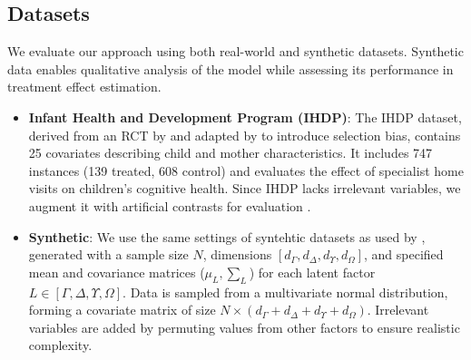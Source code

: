 \documentclass[doubleblind]{ecai}
\begin{document}
\begin{table}[!ht]
\begin{tabular}{lrrrrrrr}
			
			\bottomrule
		\end{tabular}
		
		\label{tab:IHDP}
		
	\end{table}
	\subsection{Datasets}
	We evaluate our approach using both real-world and synthetic datasets. Synthetic data enables qualitative analysis of the model while assessing its performance in treatment effect estimation.
	\begin{itemize}
		
		\item \textbf{Infant Health and Development Program (IHDP)}: The IHDP dataset, derived from an RCT by \citet{Gunn} and adapted by \citet{Hill} to introduce selection bias, contains 25 covariates describing child and mother characteristics. It includes 747 instances (139 treated, 608 control) and evaluates the effect of specialist home visits on children’s cognitive health. Since IHDP lacks irrelevant variables, we augment it with artificial contrasts for evaluation \citep{Khan2024OnTE}.
		
		\item \textbf{Synthetic}: We use the same settings of syntehtic datasets as used by \citet{Negar,Khan2024OnTE}, generated with a sample size 
		$N$, dimensions $\left[{d}_{\Gamma},{d}_{\Delta},{d}_{\Upsilon},{d}_{\Omega}\right]$, and specified mean and covariance matrices ($\mu_{L},\sum_{L}$) for each latent factor $L \in \left[\Gamma,\Delta,\Upsilon,\Omega \right]$. Data is sampled from a multivariate normal distribution, forming a covariate matrix of size $N \times (d_{\Gamma}+d_{\Delta}+d_{\Upsilon}+{d}_{\Omega})$. Irrelevant variables are added by permuting values from other factors to ensure realistic complexity.
		
		
	\end{itemize}
\end{document}
